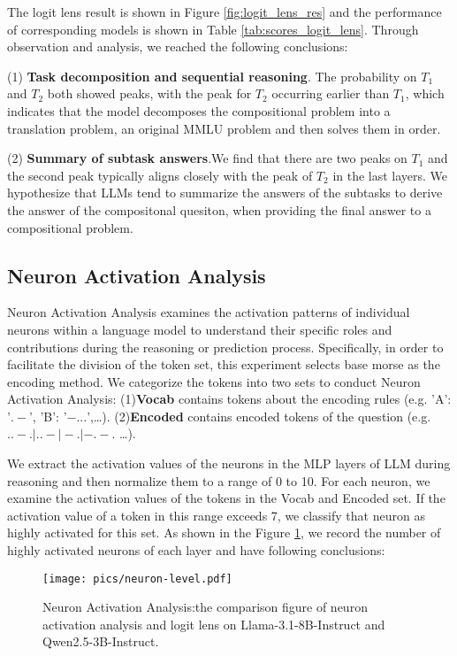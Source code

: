The logit lens result is shown in Figure \ref{fig:logit_lens_res} and the performance of corresponding models is shown in Table \ref{tab:scores_logit_lens}. Through observation and analysis, we reached the following conclusions:

(1) \textbf{Task decomposition and sequential reasoning}. The probability on $ T_1 $ and $ T_2 $ both showed peaks, with the peak for $ T_2 $ occurring earlier than $ T_1 $, which indicates that the model decomposes the compositional problem into a translation problem, an original MMLU problem and then solves them in order.

(2) \textbf{Summary of subtask answers}.We find that there are two peaks on $ T_1 $ and the second peak typically aligns closely with the peak of $ T_2 $ in the last layers. We hypothesize that LLMs tend to summarize the answers of the subtasks to derive the answer of the compositonal quesiton, when providing the final answer to a compositional problem.

\subsection{Neuron Activation Analysis}
Neuron Activation Analysis examines the activation patterns of individual neurons within a language model to understand their specific roles and contributions during the reasoning or prediction process. Specifically, in order to facilitate the division of the token set, this experiment selects base morse as the encoding method.
We categorize the tokens into two sets to conduct Neuron Activation Analysis: 
(1)\textbf{Vocab} contains tokens about the encoding rules (e.g. 'A': '$.-$', 'B': '$-...$',\dots).
(2)\textbf{Encoded} contains encoded tokens of the question (e.g. $..-.|..-|-.|-.-.$ \dots).

We extract the activation values of the neurons in the MLP layers of LLM during reasoning and then normalize them to a range of 0 to 10. 
For each neuron, we examine the activation values of the tokens in the Vocab and Encoded set. 
If the activation value of a token in this range exceeds 7, we classify that neuron as highly activated for this set. 
As shown in the Figure \ref{fig:neuron-level}, we record the number of highly activated neurons of each layer and have following conclusions:


\begin{figure}[h!]
\vskip 0.2in
\begin{center}
\centerline{\texttt{[image: pics/neuron-level.pdf]}}
\caption{Neuron Activation Analysis:the comparison figure of neuron activation analysis and logit lens on Llama-3.1-8B-Instruct and Qwen2.5-3B-Instruct.}
\label{fig:neuron-level}
\end{center}
\vskip -0.2in
\end{figure}

